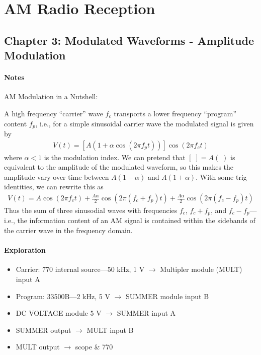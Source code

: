 \documentclass[../main.tex]{subfiles}
\begin{document}
\pagestyle{fancy}
\section{AM Radio Reception}

\subsection{Chapter 3: Modulated Waveforms - Amplitude Modulation}

\paragraph*{Notes}
AM Modulation in a Nutshell: 

A high frequency ``carrier'' wave $f_c$ transports a lower frequency ``program'' content $f_p$, i.e.,
for a simple sinusoidal carrier wave the modulated signal is given by
\begin{align*}
    V(t) = [A(1 + \alpha\cos(2\pi f_p t))]\cos(2\pi f_c t)
\end{align*}
where $\alpha < 1$ is the modulation index. We can pretend that $[\;] = A(\;)$ is equivalent to the
amplitude of the modulated waveform, so this makes the amplitude vary over time between $A(1 - \alpha)$ and $A(1 + \alpha)$.
With some trig identities, we can rewrite this as
\begin{align*}
    V(t) = A\cos(2\pi f_c t) + \frac{A\alpha}{2}\cos(2\pi(f_c + f_p)t) + \frac{A\alpha}{2}\cos(2\pi(f_c - f_p)t)
\end{align*}
Thus the sum of three sinusodial waves with frequencies $f_c$, $f_c + f_p$, and $f_c - f_p$---i.e.,
the information content of an AM signal is contained within the sidebands of the carrier wave in the frequency domain.

\paragraph*{Exploration}
\begin{itemize}
    \item Carrier: 770 internal source---50 kHz, 1 V $\to$ Multipler module (MULT) input A
    \item Program: 33500B---2 kHz, 5 V $\to$ SUMMER module input B 
    \item DC VOLTAGE module 5 V $\to$ SUMMER input A
    \item SUMMER output $\to$ MULT input B
    \item MULT output $\to$ scope \& 770
\end{itemize}
\end{document}

